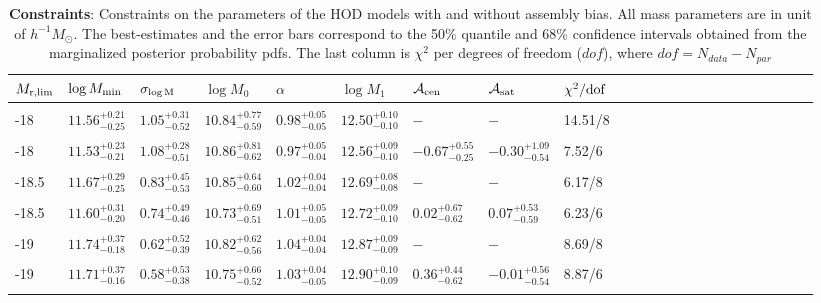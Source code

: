 \documentclass[12pt, preprint]{aastex}
\newcommand{\mzero}{\log M_{0}}
\newcommand{\mone}{\log M_{1}}
\newcommand{\mmin}{\log M_{\rm min}}
\newcommand{\sigmam}{\sigma_{\log \rm M}}
\newcommand{\acen}{\mathcal{A}_{\rm cen}}
\newcommand{\asat}{\mathcal{A}_{\rm sat}}
\begin{document}
\begin{table}
\begin{center}
  \label{tab:constraints}
 \caption{{\bf Constraints}: Constraints on the parameters of the HOD models with and without assembly bias. 
All mass parameters are in unit of $h^{-1}M_\odot$. The best-estimates and the error bars correspond to the 50$\%$ quantile and 68$\%$ confidence intervals obtained from the marginalized posterior probability pdfs. The last column is $\chi^{2}$ per degrees of freedom ($dof$), where $dof = N_{data} - N_{par}$}
\begin{tabular}{@{}lllllllllllllllllllllll}
\hline 
   $M_{\rm r,lim}$ & $\mmin$ & $\sigmam$ & $\mzero$ & $\alpha$ &  $\mone$ & $\acen$ & $\asat$ & $\chi^{2}/\rm{dof}$ \\  \hline
  \\ 
 -18 & $11.56^{+0.21}_{-0.25}$ &  $1.05^{+0.31}_{-0.52}$ & $10.84^{+0.77}_{-0.59}$ & $0.98^{+0.05}_{-0.05}$ &  $12.50^{+0.10}_{-0.10}$ & $-$ & $-$ & 14.51/8\\\\
     
  -18 & $11.53^{+0.23}_{-0.21}$ &  $1.08^{+0.28}_{-0.51}$ & $10.86^{+0.81}_{-0.62}$ & $0.97^{+0.05}_{-0.04}$ &  $12.56^{+0.09}_{-0.10}$ & $-0.67^{+0.55}_{-0.25}$ & $-0.30^{+1.09}_{-0.54}$ & 7.52/6\\ \\
     
-18.5 & $11.67^{+0.29}_{-0.25}$ &  $0.83^{+0.45}_{-0.53}$ & $10.85^{+0.64}_{-0.60}$ & $1.02^{+0.04}_{-0.04}$ &  $12.69^{+0.08}_{-0.08}$ & $-$ & $-$ & 6.17/8\\ \\
    
-18.5 & $11.60^{+0.31}_{-0.20}$ &  $0.74^{+0.49}_{-0.46}$ & $10.73^{+0.69}_{-0.51}$ & $1.01^{+0.05}_{-0.05}$ &  $12.72^{+0.09}_{-0.10}$ & $0.02^{+0.67}_{-0.62}$ & $0.07^{+0.53}_{-0.59}$ & 6.23/6\\ \\

-19 & $11.74^{+0.37}_{-0.18}$ &  $0.62^{+0.52}_{-0.39}$ & $10.82^{+0.62}_{-0.56}$ & $1.04^{+0.04}_{-0.04}$ &  $12.87^{+0.09}_{-0.09}$ & $-$ & $-$ & 8.69/8\\ \\

-19 & $11.71^{+0.37}_{-0.16}$ &  $0.58^{+0.53}_{-0.38}$ & $10.75^{+0.66}_{-0.52}$ & $1.03^{+0.04}_{-0.05}$ &  $12.90^{+0.10}_{-0.09}$ & $0.36^{+0.44}_{-0.62}$ & $-0.01^{+0.56}_{-0.54}$ & 8.87/6\\ \\


\end{tabular}
\end{center}
\end{table}
\end{document}
